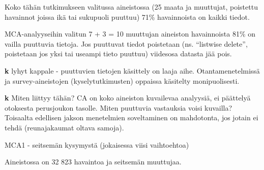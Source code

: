 \documentclass[
  finnish,
]{book}
\newenvironment{Shaded}{\begin{snugshade}}{\end{snugshade}}
\newcommand{\CommentTok}[1]{\textcolor[rgb]{0.56,0.35,0.01}{\textit{#1}}}
\begin{document}
\begin{Shaded}
\end{Shaded}

Koko tähän tutkimukseen valitussa aineistossa (25 maata ja muuttujat, poistettu
havainnot joissa ikä tai sukupuoli puuttuu) 71\% havainnoista on kaikki tiedot.

MCA-analyyseihin valitun 7 + 3 = 10 muuttujan aineiston havainnoista 81\% on
vailla puuttuvia tietoja. Jos puuttuvat tiedot poistetaan (ns. ``listwise delete'',
poistetaan jos yksi tai useampi tieto puuttuu) viidesosa datasta jää pois.

\textbf{k} lyhyt kappale - puuttuvien tietojen käsittely on laaja aihe. Otantamenetelmissä ja survey-aineistojen (kyselytutkimusten) oppaissa käsitelty monipuolisesti.

\textbf{k} Miten liittyy tähän? CA on koko aineiston kuvailevaa analyysiä, ei päättelyä
otoksesta perusjoukon tasolle. Miten puuttuvia vastauksia voisi kuvailla? Toisaalta
edellisen jakson menetelmien soveltaminen on mahdotonta, jos jotain ei tehdä
(reunajakaumat oltava samoja).

MCA1 - seitsemän kysymystä (jokaisessa viisi vaihtoehtoa)

Aineistossa on 32 823 havaintoa ja seitsemän muuttujaa.
\end{document}
